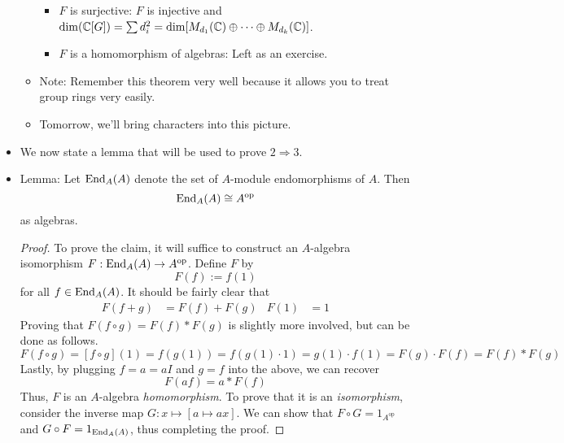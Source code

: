 \documentclass[../notes.tex]{subfiles}
\begin{document}
\begin{itemize}
\begin{itemize}
\begin{itemize}
            \item $F$ is surjective: $F$ is injective and $\dim(\mathbb{C}[G])=\sum d_i^2=\dim[M_{d_1}(\mathbb{C})\oplus\cdots\oplus M_{d_k}(\mathbb{C})]$.
            \item $F$ is a homomorphism of algebras: Left as an exercise.
        \end{itemize}
        \item Note: Remember this theorem very well because it allows you to treat group rings very easily.
        \item Tomorrow, we'll bring characters into this picture.
    \end{itemize}
    \item We now state a lemma that will be used to prove $2\Rightarrow 3$.
    \item Lemma: Let $\operatorname{End}_A(A)$ denote the set of $A$-module endomorphisms of $A$. Then
    \begin{equation*}
        \operatorname{End}_A(A) \cong A^\text{op}
    \end{equation*}
    as algebras.
    \begin{proof}
        To prove the claim, it will suffice to construct an $A$-algebra isomorphism $F:\operatorname{End}_A(A)\to A^\text{op}$. Define $F$ by
        \begin{equation*}
            F(f) := f(1)
        \end{equation*}
        for all $f\in\operatorname{End}_A(A)$. It should be fairly clear that
        \begin{align*}
            F(f+g) &= F(f)+F(g)&
            F(1) &= 1
        \end{align*}
        Proving that $F(f\circ g)=F(f)*F(g)$ is slightly more involved, but can be done as follows.
        \begin{equation*}
            F(f\circ g) = [f\circ g](1)
            = f(g(1))
            = f(g(1)\cdot 1)
            = g(1)\cdot f(1)
            = F(g)\cdot F(f)
            = F(f)*F(g)
        \end{equation*}
        Lastly, by plugging $f=a=aI$ and $g=f$ into the above, we can recover
        \begin{equation*}
            F(af) = a*F(f)
        \end{equation*}
        Thus, $F$ is an $A$-algebra \emph{homomorphism}. To prove that it is an \emph{isomorphism}, consider the inverse map $G:x\mapsto[a\mapsto ax]$. We can show that $F\circ G=1_{A^\text{op}}$ and $G\circ F=1_{\operatorname{End}_A(A)}$, thus completing the proof.
    \end{proof}

\end{itemize}
\end{document}
